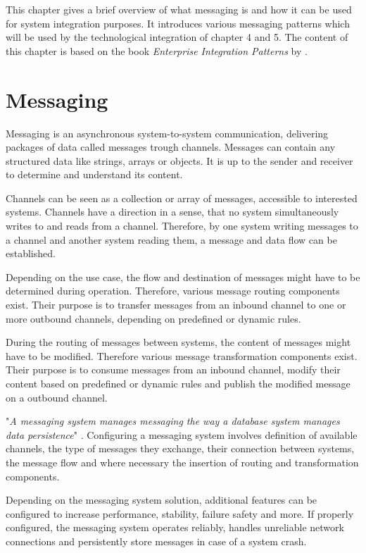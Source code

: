 This chapter gives a brief overview of what messaging is and how it can be used for system integration purposes. It introduces various messaging patterns which will be used by the technological integration of chapter 4 and 5.
The content of this chapter is based on the book \textit{Enterprise Integration Patterns} by \textcite{EIP}.

\section{Messaging}

Messaging is an asynchronous system-to-system communication, delivering packages of data called messages trough channels. Messages can contain any structured data like strings, arrays or objects. It is up to the sender and receiver to determine and understand its content.

Channels can be seen as a collection or array of messages, accessible to interested systems. Channels have a direction in a sense, that no system simultaneously writes to and reads from a channel. Therefore, by one system writing messages to a channel and another system reading them, a message and data flow can be established.

Depending on the use case, the flow and destination of messages might have to be determined during operation. Therefore, various message routing components exist. Their purpose is to transfer messages from an inbound channel to one or more outbound channels, depending on predefined or dynamic rules.

During the routing of messages between systems, the content of messages might have to be modified. Therefore various message transformation components exist. Their purpose is to consume messages from an inbound channel, modify their content based on predefined or dynamic rules and publish the modified message on a outbound channel.

"\textit{A messaging system manages messaging the way a database system manages data persistence}" \cite[p. 31]{EIP}. Configuring a messaging system involves definition of available channels, the type of messages they exchange, their connection between systems, the message flow and where necessary the insertion of routing and transformation components.

Depending on the messaging system solution, additional features can be configured to increase performance, stability, failure safety and more. If properly configured, the messaging system operates reliably, handles unreliable network connections and persistently store messages in case of a system crash.

